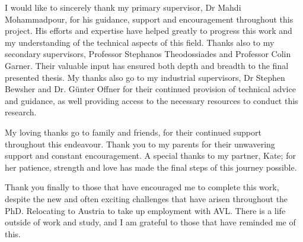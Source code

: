 
\begin{acknowledgements}      

I would like to sincerely thank my primary supervisor, Dr Mahdi Mohammadpour, for his guidance, support and encouragement throughout this project. His efforts and expertise have helped greatly to progress this work and my understanding of the technical aspects of this field. Thanks also to my secondary supervisors, Professor Stephanos Theodossiades and Professor Colin Garner. Their valuable input has ensured both depth and breadth to the final presented thesis. My thanks also go to my industrial supervisors, Dr Stephen Bewsher and Dr. Günter Offner for their continued provision of technical advice and guidance, as well providing access to the necessary resources to conduct this research.

My loving thanks go to family and friends, for their continued support throughout this endeavour. Thank you to my parents for their unwavering support and constant encouragement. A special thanks to my partner, Kate; for her patience, strength and love has made the final steps of this journey possible.

Thank you finally to those that have encouraged me to complete this work, despite the new and often exciting challenges that have arisen throughout the PhD. Relocating to Austria to take up employment with AVL. There is a life outside of work and study, and I am grateful to those that have reminded me of this.

\end{acknowledgements}
